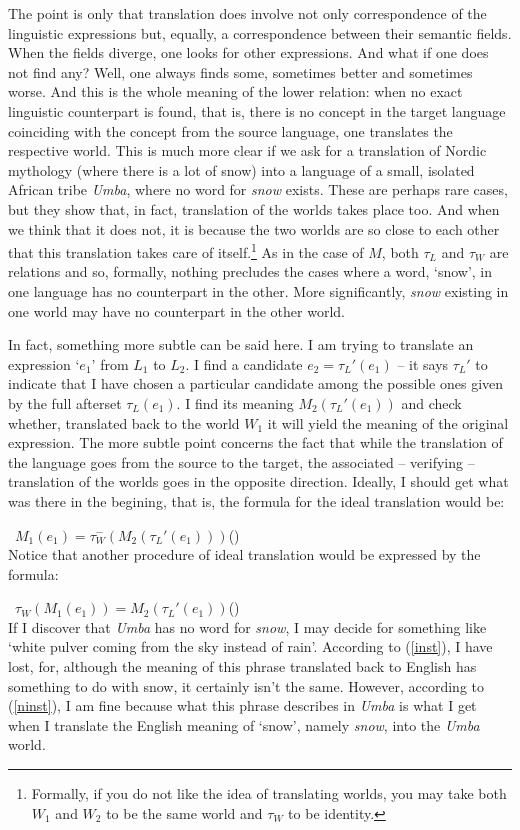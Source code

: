 \documentclass[10pt]{article}
\newcounter{EQ}
\newcommand{\equ}[1]{\refstepcounter{EQ}\vspace{.5ex}\par\noindent\ 
    \hfill $#1$\hfill{(\theEQ)}\\[.5ex]}
\newcommand{\refe}[1]{(\ref{#1})}
\newcommand{\<}{\langle}
\renewcommand{\>}{\rangle}
\newcommand{\wo}[1]{`#1'}
\newcommand{\thi}[1]{{\sl{#1}\/}}
\begin{document}
The point is only that translation does involve not only correspondence of 
the linguistic expressions but, equally, a correspondence between their 
semantic fields. When the fields diverge, one looks for other expressions. 
And what if one does not find any? Well, one always finds some, sometimes 
better and sometimes worse. And this is the whole meaning of the lower 
relation: when no exact linguistic counterpart is found, that is, there is 
no concept in the target language coinciding with the concept from the 
source language, one translates the respective world. This is much more 
clear if we ask for a translation of Nordic mythology (where there is a lot 
of snow) into a language of a small, isolated African tribe {\em Umba}, 
where no word 
for \thi{snow} exists. These are perhaps rare cases, but they show that, 
in fact, translation of the worlds takes place too. And when we think that 
it does not, it is because the two worlds are so close to each other that 
this translation takes care of itself.\footnote{Formally, if you do not 
like the idea of translating worlds, you may take both $W_1$ and $W_2$ to 
be the same world and $\tau_W$ to be identity.}
As in the case of $M$, both $\tau_L$ and $\tau_W$ are relations and so, 
formally, nothing precludes the cases where a word, \wo{snow}, in one 
language has no counterpart in the other. More significantly, \thi{snow} 
existing in one world may have no counterpart in the other world.

In fact, something more subtle can be said here. I am trying to translate 
an expression \wo{$e_1$} from $L_1$ to $L_2$. I find a candidate 
$e_2=\tau_L'(e_1)$ -- it says $\tau_L'$ to indicate that I 
have chosen a particular candidate among the possible ones given by the 
full afterset $\tau_L(e_1)$. I find its meaning $M_2(\tau_L'({e_1}))$ and 
check whether, translated back to the world $W_1$ it will yield the meaning 
of the original expression. The more subtle point concerns the fact that 
while the translation of the language goes from the source to the target, 
the associated -- verifying -- translation of the worlds goes in the 
opposite direction. Ideally, I should get what was there in the begining, 
that is, the formula for the ideal translation would be:
\equ{\label{inst} 
M_1({e_1}) = \tau_W^-(M_2(\tau_L'({e_1}))) }
Notice that another procedure of ideal translation would be expressed by 
the formula:
\equ{\label{ninst} 
\tau_W(M_1({e_1})) = M_2(\tau_L'({e_1})) }
If I discover that {\em Umba} has no word for \thi{snow}, I may decide for 
something like \wo{white pulver coming from the sky instead of rain}. 
According to \refe{inst}, I have lost, for, although the meaning of this 
phrase translated back to English has something to do with snow, it 
certainly isn't the same. However, according to \refe{ninst}, I am fine 
because what this phrase describes in {\em Umba} is what I get when I 
translate the English meaning of \wo{snow}, namely \thi{snow}, into 
the {\em Umba} world.
\end{document}
